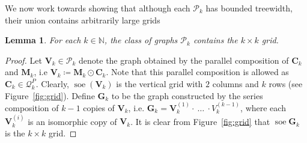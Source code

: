 \documentclass[a4paper,onecolumn,11pt,accepted=2026-01-06]{quantumarticle}
\theoremstyle{plain}
\newtheorem{lem}[thm]{Lemma}
\theoremstyle{remark}
\theoremstyle{definition}
\DeclareMathOperator{\soe}{soe}
\def\calP{{\mathcal P}} \def\calQ{{\mathcal Q}} \def\calR{{\mathcal R}}
\begin{document}
    

We now work towards showing that although each $\calP_k$ has bounded treewidth, their union contains arbitrarily large grids  

\begin{lem}\label{lem:unbounded-tw}
     For each $k \in \mathbb{N}$, the class of graphs $\calP_k$ contains the $k \times k$ grid.   
\end{lem}
\begin{proof}
  Let $\boldsymbol{V}_k \in \calP_k$ denote the graph obtained by the parallel composition of $\boldsymbol{C}_k$ and $\boldsymbol{M}_k$, i.e $\boldsymbol{V}_k \coloneqq \boldsymbol{M}_k \odot \boldsymbol{C}_k$. Note that this parallel composition is allowed as $\boldsymbol{C}_k \in \calQ_k^P$. Clearly, $\soe(\boldsymbol{V}_k)$ is the vertical grid with $2$ columns and $k$ rows (see Figure~\ref{fig:grid}). Define $\boldsymbol{G}_k$ to be the graph constructed by the series composition of $k-1$ copies of $\boldsymbol{V}_k$, i.e. $\boldsymbol{G}_k = \boldsymbol{V}_k^{(1)} \cdot \ \dots \ \cdot V_k^{(k-1)}$, 
  where each $\boldsymbol{V}_k^{(i)}$ is an isomorphic copy of $\boldsymbol{V}_k$. It is clear from Figure~\ref{fig:grid} that $\soe \boldsymbol{G}_k$ is the $k \times k$ grid. 
\end{proof}
\end{document}
